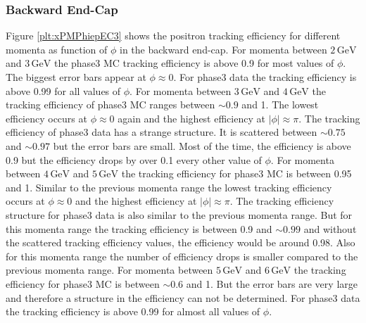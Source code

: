 \documentclass[a4paper,11pt,twosided,final,german,openbib,pdftex,listof=totoc,bibliography=totoc]{scrbook}
\begin{document}
\newpage

\subsubsection{Backward End-Cap}

Figure \ref{plt:xPMPhiepEC3} shows the positron tracking efficiency for different momenta as function of $\phi$ in the backward end-cap.
For momenta between $2\,\textrm{GeV}$ and $3\,\textrm{GeV}$ the phase3 MC tracking efficiency is above 0.9 for most values of $\phi$. The biggest error bars appear at $\phi \approx 0$. For phase3 data the tracking efficiency is above 0.99 for all values of $\phi$.
For momenta between $3\,\textrm{GeV}$ and $4\,\textrm{GeV}$ the tracking efficiency of phase3 MC ranges between $\sim 0.9$ and 1. The lowest efficiency occurs at $\phi \approx 0$ again and the highest efficiency at $|\phi| \approx \pi$. The tracking efficiency of phase3 data has a strange structure. It is scattered between $\sim 0.75$ and $\sim 0.97$ but the error bars are small. Most of the time, the efficiency is above 0.9 but the efficiency drops by over 0.1 every other value of $\phi$.
For momenta between $4\,\textrm{GeV}$ and $5\,\textrm{GeV}$ the tracking efficiency for phase3 MC is between 0.95 and 1. Similar to the previous momenta range the lowest tracking efficiency occurs at  $\phi \approx 0$ and the highest efficiency at $|\phi| \approx \pi$. The tracking efficiency structure for phase3 data is also similar to the previous momenta range. But for this momenta range the tracking efficiency is between 0.9 and $\sim 0.99$ and without the scattered tracking efficiency values, the efficiency would be around 0.98. Also for this momenta range the number of efficiency drops is smaller compared to the previous momenta range.
For momenta between $5\,\textrm{GeV}$ and $6\,\textrm{GeV}$ the tracking efficiency for phase3 MC is between $\sim 0.6$ and 1. But the error bars are very large and therefore a structure in the efficiency can not be determined. For phase3 data the tracking efficiency is above 0.99 for almost all values of $\phi$.
\end{document}
